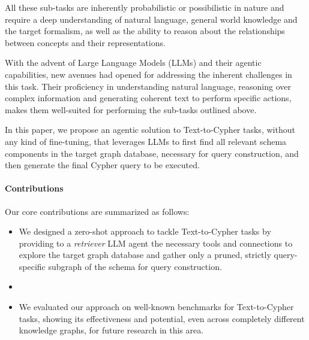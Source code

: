 All these sub-tasks are inherently probabilistic or possibilistic in nature and require a deep understanding of natural language, general world knowledge and the target formalism, as well as the ability to reason about the relationships between concepts and their representations.

With the advent of Large Language Models (LLMs) and their agentic capabilities, new avenues had opened for addressing the inherent challenges in this task. Their proficiency in understanding natural language, reasoning over complex information and generating coherent text to perform specific actions, makes them well-suited for performing the sub-tasks outlined above.

In this paper, we propose an agentic solution to Text-to-Cypher tasks, without any kind of fine-tuning, that leverages LLMs to first find all relevant schema components in the target graph database, necessary for query construction, and then generate the final Cypher query to be executed.

\paragraph{Contributions} Our core contributions are summarized as follows:
\begin{itemize}
  \item We designed a zero-shot approach to tackle Text-to-Cypher tasks by providing to a \textit{retriever} LLM agent the necessary tools and connections to explore the target graph database and gather only a pruned, strictly query-specific subgraph of the schema for query construction.
  \item 
  \item We evaluated our approach on well-known benchmarks for Text-to-Cypher tasks, showing its effectiveness and potential, even across completely different knowledge graphs, for future research in this area.
\end{itemize}


